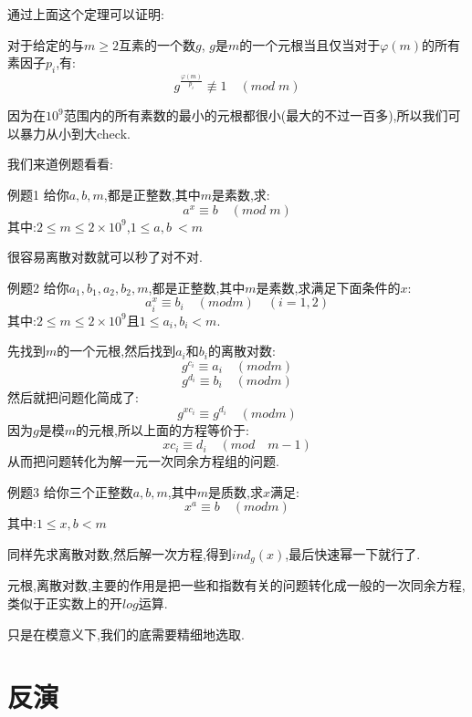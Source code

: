 \documentclass[9pt]{beamer}
\begin{document}
		\begin{frame}
			通过上面这个定理可以证明:
			\begin{theorem}
				对于给定的与$m \geq 2$互素的一个数$g$, $g$是$m$的一个元根当且仅当对于$\varphi(m)$的所有素因子$p_i$,有:
				$$
				g^{\frac{\varphi(m)}{p_i}} \not \equiv 1 \quad (mod \; m)
				$$
			\end{theorem}
			因为在$10^9$范围内的所有素数的最小的元根都很小(最大的不过一百多),所以我们可以暴力从小到大check.
		\end{frame}
		
		\begin{frame}
			我们来道例题看看:
			\begin{block}{例题1}
				给你$a,b,m$,都是正整数,其中$m$是素数,求:
				$$
					a^x \equiv b \quad (mod \; m)
				$$
				其中:$2 \leq m \leq 2\times10^9$,$1 \leq a, b\ < m$
			\end{block}
			很容易离散对数就可以秒了对不对.
		\end{frame}
		\begin{frame}
			\begin{block}{例题2}
				给你$a_1,b_1,a_2,b_2,m$,都是正整数,其中$m$是素数,求满足下面条件的$x$:
				$$
					a_i^x \equiv b_i \quad (mod m) \quad(i = 1, 2)
				$$
				其中:$2 \leq m \leq 2\times10^9$且$1 \leq a_i, b_i < m$.
			\end{block}

		\end{frame}
		\begin{frame}
				先找到$m$的一个元根,然后找到$a_i$和$b_i$的离散对数:
				$$
				g^{c_i} \equiv a_i \quad (mod m)
				$$
				$$
				g^{d_i} \equiv b_i \quad( mod m)
				$$
				然后就把问题化简成了:
				$$
				g^{xc_i} \equiv g^{d_i} \quad( mod m)
				$$
				因为$g$是模$m$的元根,所以上面的方程等价于:
				$$
					xc_i \equiv d_i \quad(mod \quad m - 1)
				$$
				从而把问题转化为解一元一次同余方程组的问题.
			\end{frame}
						
			\begin{frame}
				\begin{block}{例题3}
				给你三个正整数$a,b,m$,其中$m$是质数,求$x$满足:
				$$
						x^a \equiv b \quad (mod m)
				$$
				其中:$1 \leq x, b< m$
				\end{block}
				同样先求离散对数,然后解一次方程,得到$ind_g(x)$,最后快速幂一下就行了.
			\end{frame}
			\begin{frame}
				元根,离散对数,主要的作用是把一些和指数有关的问题转化成一般的一次同余方程,类似于正实数上的开$log$运算.
				
				只是在模意义下,我们的底需要精细地选取.
			\end{frame}
	
		\section{反演}
		
				
\end{document}

